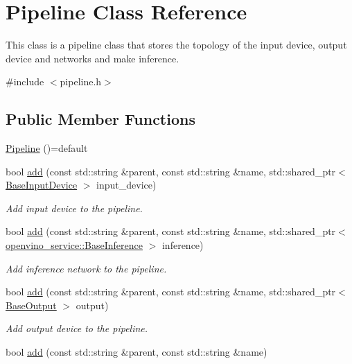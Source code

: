 \hypertarget{classPipeline}{}\section{Pipeline Class Reference}
\label{classPipeline}


This class is a pipeline class that stores the topology of the input device, output device and networks and make inference.  




{\ttfamily \#include $<$pipeline.\+h$>$}

\subsection*{Public Member Functions}
\begin{DoxyCompactItemize}
\item 
\hyperlink{classPipeline_a4f65be70dd15f3c0550f6768244098a6}{Pipeline} ()=default
\item 
bool \hyperlink{classPipeline_ad4e6ed704a4dc3df23488a9cf5cf2ae0}{add} (const std\+::string \&parent, const std\+::string \&name, std\+::shared\+\_\+ptr$<$ \hyperlink{classBaseInputDevice}{Base\+Input\+Device} $>$ input\+\_\+device)
\begin{DoxyCompactList}\small\item\em Add input device to the pipeline. \end{DoxyCompactList}\item 
bool \hyperlink{classPipeline_ad680458b60d24030e7fe17343ddb6fba}{add} (const std\+::string \&parent, const std\+::string \&name, std\+::shared\+\_\+ptr$<$ \hyperlink{classopenvino__service_1_1BaseInference}{openvino\+\_\+service\+::\+Base\+Inference} $>$ inference)
\begin{DoxyCompactList}\small\item\em Add inference network to the pipeline. \end{DoxyCompactList}\item 
bool \hyperlink{classPipeline_a0fea1a0e2a297420afcd1aef773148b6}{add} (const std\+::string \&parent, const std\+::string \&name, std\+::shared\+\_\+ptr$<$ \hyperlink{classBaseOutput}{Base\+Output} $>$ output)
\begin{DoxyCompactList}\small\item\em Add output device to the pipeline. \end{DoxyCompactList}\item 
bool \hyperlink{classPipeline_a92f954c069e1355df63f753a656ac3ec}{add} (const std\+::string \&parent, const std\+::string \&name)

\end{DoxyCompactItemize}
